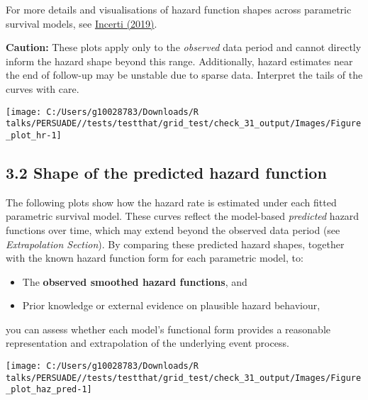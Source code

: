 \documentclass[
]{article}
\providecommand{\tightlist}{%
  \setlength{\itemsep}{0pt}\setlength{\parskip}{0pt}}
\begin{document}
For more details and visualisations of hazard function shapes across
parametric survival models, see
\href{https://devinincerti.com/2019/06/18/parametric_survival.html}{Incerti
(2019)}.

\textbf{Caution:} These plots apply only to the \emph{observed} data
period and cannot directly inform the hazard shape beyond this range.
Additionally, hazard estimates near the end of follow-up may be unstable
due to sparse data. Interpret the tails of the curves with care.

\clearpage

\begin{flushleft}\texttt{[image: C:/Users/g10028783/Downloads/R talks/PERSUADE//tests/testthat/grid\_test/check\_31\_output/Images/Figure\_plot\_hr-1]} \end{flushleft}

\clearpage

\subsection{3.2 Shape of the predicted hazard
function}\label{shape-of-the-predicted-hazard-function}

The following plots show how the hazard rate is estimated under each
fitted parametric survival model. These curves reflect the model-based
\emph{predicted} hazard functions over time, which may extend beyond the
observed data period (see \emph{Extrapolation Section}). By comparing
these predicted hazard shapes, together with the known hazard function
form for each parametric model, to:

\begin{itemize}
\tightlist
\item
  The \textbf{observed smoothed hazard functions}, and\\
\item
  Prior knowledge or external evidence on plausible hazard behaviour,
\end{itemize}

you can assess whether each model's functional form provides a
reasonable representation and extrapolation of the underlying event
process.

\clearpage

\begin{flushleft}\texttt{[image: C:/Users/g10028783/Downloads/R talks/PERSUADE//tests/testthat/grid\_test/check\_31\_output/Images/Figure\_plot\_haz\_pred-1]} \end{flushleft}
\end{document}
